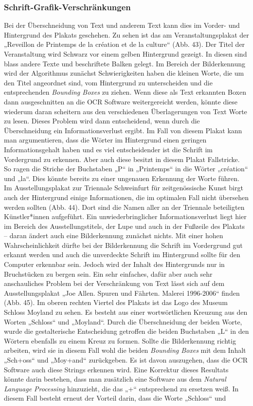 \documentclass[a4paper,12pt,ngerman]{article}
\begin{document}
\subsubsection{Schrift-Grafik-Verschränkungen}
Bei der Überschneidung von Text und anderem Text kann dies im Vorder- und Hintergrund des Plakats geschehen. Zu sehen ist das am Veranstaltungsplakat der „Reveillon de Printemps de la création et de la culture“ (Abb. 43). Der Titel der Veranstaltung wird Schwarz vor einem gelben Hintergrund gezeigt. In diesen sind blass andere Texte und beschriftete Balken gelegt. Im Bereich der Bilderkennung wird der Algorithmus zunächst Schwierigkeiten haben die kleinen Worte, die um den Titel angeordnet sind, vom Hintergrund zu unterscheiden und die entsprechenden \textit{Bounding Boxes} zu ziehen. Wenn diese als Text erkannten Boxen dann ausgeschnitten an die OCR Software weitergereicht werden, könnte diese wiederum daran scheitern aus den verschiedenen Überlagerungen von Text Worte zu lesen. Dieses Problem wird dann entscheidend, wenn durch die Überschneidung ein Informationsverlust ergibt. Im Fall von diesem Plakat kann man argumentieren, dass die Wörter im Hintergrund einen geringen Informationsgehalt haben und es viel entscheidender ist die Schrift im Vordergrund zu erkennen. Aber auch diese besitzt in diesem Plakat Fallstricke. So ragen die Striche der Buchstaben „P“ in „Printemps“ in die Wörter „création“ und „la“. Dies könnte bereits zu einer ungenauen Erkennung der Worte führen. Im Ausstellungsplakat zur Triennale Schweinfurt für zeitgenössische Kunst birgt auch der Hintergrund einige Informationen, die im optimalen Fall nicht übersehen werden sollten (Abb. 44). Dort sind die Namen aller an der Triennale beteiligten Künstler*innen aufgeführt. Ein unwiederbringlicher Informationsverlust liegt hier im Bereich des Ausstellungstitels, der Lupe und auch in der Fußzeile des Plakats – daran ändert auch eine Bilderkennung zunächst nichts. Mit einer hohen Wahrscheinlichkeit dürfte bei der Bilderkennung die Schrift im Vordergrund gut erkannt werden und auch die unverdeckte Schrift im Hintergrund sollte für den Computer erkennbar sein. Jedoch wird der Inhalt des Hintergrunds nur in Bruchstücken zu bergen sein. Ein sehr einfaches, dafür aber auch sehr anschauliches Problem bei der Verschränkung von Text lässt sich auf dem Ausstellungsplakat „Joe Allen. Spuren und Fährten. Malerei 1996-2006“ finden (Abb. 45). Im oberen rechten Viertel des Plakats ist das Logo des Museum Schloss Moyland zu sehen. Es besteht aus einer wortwörtlichen Kreuzung aus den Worten „Schloss“ und „Moyland“. Durch die Überschneidung der beiden Worte, wurde die gestalterische Entscheidung getroffen die beiden Buchstaben „L“ in den Wörtern ebenfalls zu einem Kreuz zu formen. Sollte die Bilderkennung richtig arbeiten, wird sie in diesem Fall wohl die beiden \textit{Bounding Boxes} mit dem Inhalt „Sch+oss“ und „Moy+and“ zurückgeben. Es ist davon auszugehen, dass die OCR Software auch diese Strings erkennen wird. Eine Korrektur dieses Resultats könnte darin bestehen, dass man zusätzlich eine Software aus dem \textit{Natural Language Processing} hinzuzieht, die das „+“ entsprechend zu ersetzen weiß. In diesem Fall besteht erneut der Vorteil darin, dass die Worte „Schloss“ und 
\end{document}
